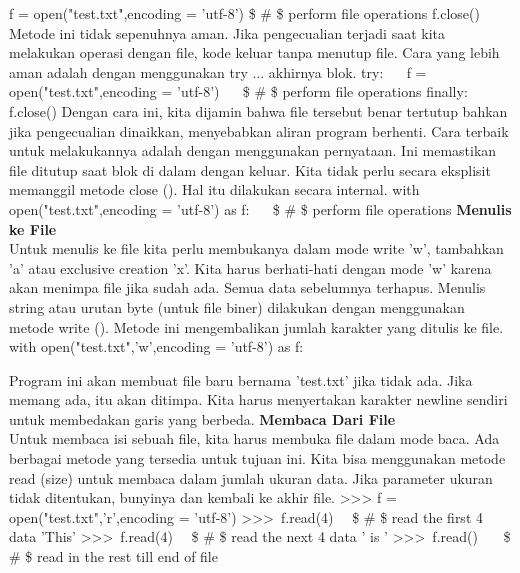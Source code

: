 f = open("test.txt",encoding = 'utf-8')  
 \$  \#  \$ perform file operations 
f.close() 
Metode ini tidak sepenuhnya aman. Jika pengecualian terjadi saat kita melakukan operasi dengan file, kode keluar tanpa menutup file. Cara yang lebih aman adalah dengan menggunakan try ... akhirnya blok.
try:  
~~ f = open("test.txt",encoding = 'utf-8')  
~~  \$  \#  \$ perform file operations 
finally: 
~~ f.close() 
Dengan cara ini, kita dijamin bahwa file tersebut benar tertutup bahkan jika pengecualian dinaikkan, menyebabkan aliran program berhenti. Cara terbaik untuk melakukannya adalah dengan menggunakan pernyataan. Ini memastikan file ditutup saat blok di dalam dengan keluar. Kita tidak perlu secara eksplisit memanggil metode close (). Hal itu dilakukan secara internal.  
with open("test.txt",encoding = 'utf-8') as f:  
~~  \$  \#  \$ perform file operations 
{\fontsize{14pt}{14pt}\selectfont \textbf{Menulis ke File} \\} 
Untuk menulis ke file kita perlu membukanya dalam mode write 'w', tambahkan 'a' atau exclusive creation 'x'. Kita harus berhati-hati dengan mode 'w' karena akan menimpa file jika sudah ada. Semua data sebelumnya terhapus. Menulis string atau urutan byte (untuk file biner) dilakukan dengan menggunakan metode write (). Metode ini mengembalikan jumlah karakter yang ditulis ke file.  
with open("test.txt",'w',encoding = 'utf-8') as f: 

Program ini akan membuat file baru bernama 'test.txt' jika tidak ada. Jika memang ada, itu akan ditimpa. Kita harus menyertakan karakter newline sendiri untuk membedakan garis yang berbeda. 
{\fontsize{14pt}{14pt}\selectfont \textbf{Membaca Dari File} \\} 
Untuk membaca isi sebuah file, kita harus membuka file dalam mode baca. Ada berbagai metode yang tersedia untuk tujuan ini. Kita bisa menggunakan metode read (size) untuk membaca dalam jumlah ukuran data. Jika parameter ukuran tidak ditentukan, bunyinya dan kembali ke akhir file.  
>>> f = open("test.txt",'r',encoding = 'utf-8')  
>>>~f.read(4)~~   \$  \#  \$ read the first 4 data 
'This' 
>>>~f.read(4)~~   \$  \#  \$ read the next 4 data 
' is '  
>>>~f.read()~~~   \$  \#  \$ read in the rest till end of file  

